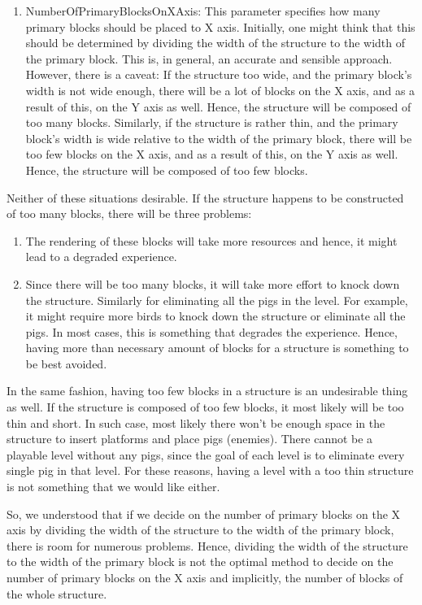 \documentclass{dalthesis}
\begin{document}
\begin{enumerate}
\begin{enumerate}
    \item NumberOfPrimaryBlocksOnXAxis: This parameter specifies how many primary blocks should be placed to X axis. Initially, one might think that this should be determined by dividing the width of the structure to the width of the primary block. This is, in general, an accurate and sensible approach. However, there is a caveat: If the structure too wide, and the primary block's width is not wide enough, there will be a lot of blocks on the X axis, and as a result of this, on the Y axis as well. Hence, the structure will be composed of too many blocks. Similarly, if the structure is rather thin, and the primary block's width is wide relative to the width of the primary block, there will be too few blocks on the X axis, and as a result of this, on the Y axis as well. Hence, the structure will be composed of too few blocks.
  \end{enumerate}

  Neither of these situations desirable. If the structure happens to be constructed of too many blocks, there will be three problems:

  \begin{enumerate}
    \item The rendering of these blocks will take more resources and hence, it might lead to a degraded experience.

    \item Since there will be too many blocks, it will take more effort to knock down the structure. Similarly for eliminating all the pigs in the level. For example, it might require more birds to knock down the structure or eliminate all the pigs. In most cases, this is something that degrades the experience. Hence, having more than necessary amount of blocks for a structure is something to be best avoided.
  \end{enumerate}

  In the same fashion, having too few blocks in a structure is an undesirable thing as well. If the structure is composed of too few blocks, it most likely will be too thin and short. In such case, most likely there won't be enough space in the structure to insert platforms and place pigs (enemies). There cannot be a playable level without any pigs, since the goal of each level is to eliminate every single pig in that level. For these reasons, having a level with a too thin structure is not something that we would like either.

  So, we understood that if we decide on the number of primary blocks on the X axis by dividing the width of the structure to the width of the primary block, there is room for numerous problems. Hence, dividing the width of the structure to the width of the primary block is not the optimal method to decide on the number of primary blocks on the X axis and implicitly, the number of blocks of the whole structure.


\end{enumerate}
\end{document}
